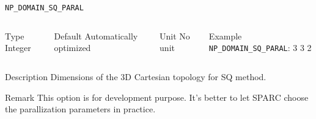\begin{frame}[allowframebreaks]{\texttt{NP\_DOMAIN\_SQ\_PARAL}} \label{NP_DOMAIN_SQ_PARAL}
\vspace*{-12pt}
\begin{columns}
\begin{block}{Type}
Integer
\end{block}

\begin{block}{Default}
Automatically optimized
\end{block}

\begin{block}{Unit}
No unit
\end{block}

\begin{block}{Example}
\texttt{NP\_DOMAIN\_SQ\_PARAL}: 3 3 2
\end{block}
\end{columns}

\begin{block}{Description}
Dimensions of the 3D Cartesian topology for SQ method.
\end{block}

\begin{block}{Remark}
This option is for development purpose. It's better to let SPARC choose the parallization parameters in practice.
\end{block}
\end{frame}
